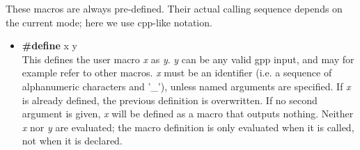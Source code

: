 These macros are always pre-defined. Their actual calling sequence depends
on the current mode; here we use cpp-like notation.
\begin{itemize}
\item
{\bf \#define } x y\\
This defines the user macro {\it x} as {\it y}. {\it y} can be any valid
gpp input, and may for example refer to other macros. {\it x} must
be an identifier (i.e. a sequence of alphanumeric characters and '\_'),
unless named arguments are specified. If {\it x} is already defined, 
the previous definition is overwritten. If no second argument is given, 
{\it x} will be defined as a macro that outputs nothing. Neither {\it x} 
nor {\it y} are evaluated; the macro definition is only evaluated when 
it is called, not when it is declared.



\end{itemize}

